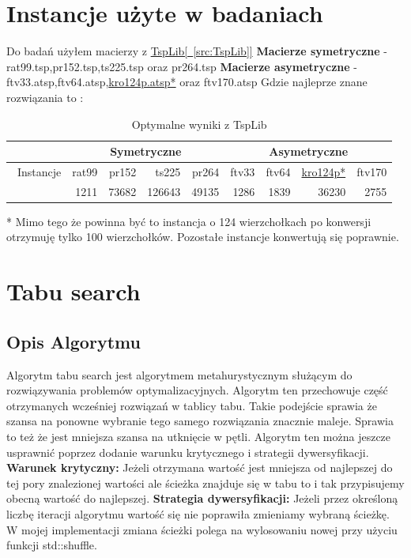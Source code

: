 \documentclass{article}
\begin{document}
    \section{Instancje użyte w badaniach}
      Do badań użyłem macierzy z \hyperref[src:TspLib]{TspLib[~\ref*{src:TspLib}]} \linebreak
      \textbf{Macierze symetryczne} - rat99.tsp,pr152.tsp,ts225.tsp oraz pr264.tsp \linebreak
      \textbf{Macierze asymetryczne} - ftv33.atsp,ftv64.atsp,\hyperref[txt:explanation1]{kro124p.atsp*}  oraz ftv170.atsp \linebreak
      Gdzie najleprze znane rozwiązania to :
      \begin{table} 
        \centering
        \begin{tabular}{|r|r|r|r|r|r|r|r|r|}
          \hline
          &\multicolumn{4}{|c|}{Symetryczne} & \multicolumn{4}{|c|}{Asymetryczne} \\ \hline\
          Instancje & rat99 & pr152 & ts225 & pr264 & ftv33 & ftv64 & \hyperref[txt:explanation1]{kro124p*}  & ftv170 \\ \hline
          & 1211 & 73682 & 126643 & 49135 & 1286 & 1839 & 36230 & 2755 \\ \hline
        \end{tabular}
        \caption{Optymalne wyniki z TspLib}
        \label{txt:opt}
      \end{table}
      \FloatBarrier
      \label{txt:explanation1}
      * Mimo tego że powinna być to instancja o 124 wierzchołkach po konwersji 
      otrzymuję tylko 100 wierzchołków. Pozostałe instancje konwertują się poprawnie.     
    \section{Tabu search}
      \subsection{Opis Algorytmu}
        Algorytm tabu search jest algorytmem metahurystycznym służącym do rozwiązywania
        problemów optymalizacyjnych. Algorytm ten przechowuje część otrzymanych wcześniej 
        rozwiązań w tablicy tabu. Takie podejście sprawia że szansa na ponowne wybranie
        tego samego rozwiązania znacznie maleje. Sprawia to też że jest mniejsza szansa 
        na utknięcie w pętli. Algorytm ten można jeszcze usprawnić poprzez dodanie 
        warunku krytycznego i strategii dywersyfikacji.\linebreak
        \textbf{Warunek krytyczny: } Jeżeli otrzymana wartość jest mniejsza
        od najlepszej do tej pory znalezionej wartości ale ścieżka znajduje się
        w tabu to i tak przypisujemy obecną wartość do najlepszej.\linebreak
        \textbf{Strategia dywersyfikacji: } Jeżeli przez określoną liczbę iteracji algorytmu
        wartość się nie poprawiła zmieniamy wybraną ścieżkę. W mojej implementacji zmiana
        ścieżki polega na wylosowaniu nowej przy użyciu funkcji std::shuffle.
\end{document}
